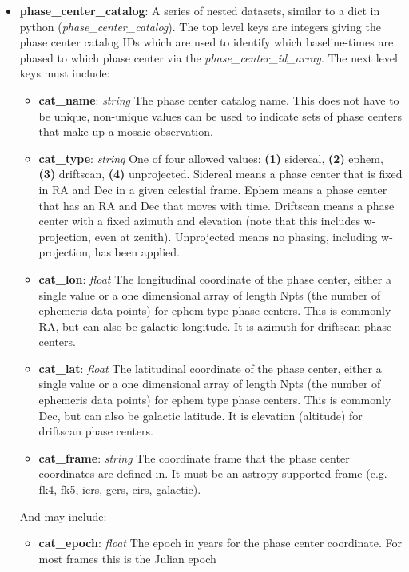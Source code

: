 \documentclass[11pt, oneside]{article}
\begin{document}
\begin{itemize}
\item \textbf{phase\_center\_catalog}: A series of nested datasets, similar to
a dict in python (\textit{phase\_center\_catalog}). The top level keys are integers
giving the phase center catalog IDs which are used to identify which
baseline-times are phased to which phase center via the \textit{phase\_center\_id\_array}.
The next level keys must include:
	\begin{itemize}
	\item \textbf{cat\_name}: \textit{string} The phase center catalog name. This
	  does not have to be unique, non-unique values can be used to indicate sets
	  of phase centers that make up a mosaic observation.
	\item \textbf{cat\_type}: \textit{string} One of four allowed values:
	  \textbf{(1)} sidereal, \textbf{(2)} ephem, \textbf{(3)} driftscan,
	  \textbf{(4)} unprojected.
  	  Sidereal means a phase center that is fixed in RA and Dec in a given
	  celestial frame.
	  Ephem means a phase center that has an RA and Dec that
	  moves with time.
	  Driftscan means a phase center with a fixed azimuth and
	  elevation (note that this includes w-projection, even at zenith).
	  Unprojected means no phasing, including w-projection, has been applied.
  	\item \textbf{cat\_lon}: \textit{float} 
	  The longitudinal coordinate of the phase center, either a single value or a
	  one dimensional array of length Npts (the number of ephemeris data points)
	  for ephem type phase centers.
	  This is commonly RA, but can also be galactic longitude. It is azimuth for
	  driftscan phase centers.
  	\item \textbf{cat\_lat}: \textit{float}
	  The latitudinal coordinate of the phase center, either a single value or a
	  one dimensional array of length Npts (the number of ephemeris data points)
	  for ephem type phase centers.
	  This is commonly Dec, but can also be galactic latitude. It is elevation (altitude)
	  for driftscan phase centers.
	\item \textbf{cat\_frame}: \textit{string} The coordinate frame that the
	  phase center coordinates are defined in. It must be an astropy
	  supported frame (e.g. fk4, fk5, icrs, gcrs, cirs, galactic).
	\end{itemize}
And may include:
	\begin{itemize}
	\item \textbf{cat\_epoch}: \textit{float} The epoch in years for the phase
	  center coordinate. For most frames this is the Julian epoch

\end{itemize}
\end{itemize}
\end{document}
